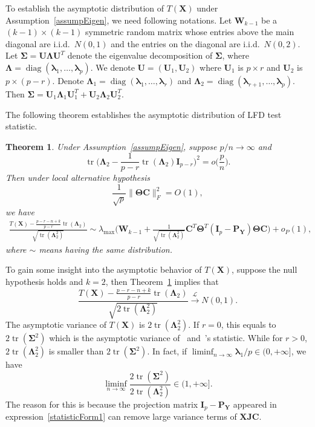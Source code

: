 \documentclass[12pt]{article} %
\DeclareMathOperator{\mytr}{tr}
\DeclareMathOperator{\mydiag}{diag}
\newcommand{\bX}{\mathbf{X}}
\newcommand{\bP}{\mathbf{P}}
\newcommand{\bY}{\mathbf{Y}}
\newcommand{\bJ}{\mathbf{J}}
\newcommand{\bC}{\mathbf{C}}
\newcommand{\bI}{\mathbf{I}}
\newcommand{\bU}{\mathbf{U}}
\newcommand{\bW}{\mathbf{W}}
\newcommand{\bfsym}[1]{\ensuremath{\boldsymbol{#1}}}
\def\blambda {\bfsym {\lambda}}
\def\bLambda {\bfsym {\Lambda}}
\def\bSigma {\bfsym {\Sigma}}
\def\bTheta {\bfsym {\Theta}}
\newtheorem{theorem}{Theorem}
\theoremstyle{definition}
\begin{document}
To establish the asymptotic distribution of $T(\bX)$ under Assumption~\ref{assumpEigen},
we need following notations.
Let $\bW_{k-1}$ be a $(k-1)\times(k-1)$ symmetric random matrix whose entries above the main diagonal are i.i.d.\ $N(0,1)$ and the entries on the diagonal are i.i.d.\ $N(0,2)$.
Let $\bSigma= \bU\bLambda \bU^T$ denote the eigenvalue decomposition of $\bSigma$, where $\bLambda =\mydiag (\blambda_1,\ldots,\blambda_p)$.
We denote $\bU=(\bU_1,\bU_2)$ where $\bU_1$ is $p\times r$ and $\bU_2$ is $p\times (p-r)$.
Denote $\bLambda_1=\mydiag(\blambda_1,\ldots,\blambda_r)$ and $\bLambda_2=\mydiag(\blambda_{r+1},\ldots,\blambda_p)$.
Then $\bSigma=\bU_1\bLambda_1 \bU_1^T+\bU_2\bLambda_2 \bU_2^T$.

The following theorem establishes the asymptotic distribution of LFD test statistic.
\begin{theorem}\label{thm1}
    Under Assumption~\ref{assumpEigen}, suppose $p/n\to \infty$ and
    $$
    \mytr\Big(\bLambda_2-\frac{1}{p-r}\mytr (\bLambda_2)\bI_{p-r}\Big)^2=o\big(\frac{p}{n}\big).
    $$
    Then under local alternative hypothesis
    \begin{equation*}
        \frac{1}{\sqrt{p}}\|\bTheta \bC\|_F^2=O(1),
    \end{equation*}
    we have
    $$
    \begin{aligned}
        \frac{T(\bX)-\frac{p-r-n+k}{p-r}\mytr(\bLambda_2)}{\sqrt{\mytr (\bLambda_2^2)}}
        \sim
        \lambda_{\max}\Big(\bW_{k-1}+\tfrac{1}{\sqrt{\mytr(\bLambda_2^2)}} \bC^T \bTheta^T (\bI_p-\bP_{\bY})\bTheta \bC\Big)
        +o_P(1),
    \end{aligned}
    $$
    where $\sim$ means having the same distribution.
\end{theorem}
To gain some insight into the asymptotic behavior of $T(\bX)$, suppose the null hypothesis holds and $k=2$, then Theorem~\ref{thm1} implies that
$$
        \frac{T(\bX)-\frac{p-r-n+k}{p-r}\mytr(\bLambda_2)}{\sqrt{2\mytr (\bLambda_2^2)}}\xrightarrow{\mathcal{L}}N(0,1).
$$
The asymptotic variance of $T(\bX)$ is ${2\mytr (\bLambda_2^2)}$.
If $r=0$, this equals to ${2\mytr (\bSigma^2)}$ which is the asymptotic variance of~\citet{Bai1996Efiect} and~\citet{Chen2010A}'s statistic.
While for $r>0$, ${2\mytr (\bLambda_2^2)}$ is smaller than $2\mytr(\bSigma^2)$.
In fact, if $\liminf_{n\to \infty} \blambda_1/p \in (0,+\infty]$, we have
$$
\liminf_{n\to \infty}\frac{2\mytr(\bSigma^2)}{2\mytr(\bLambda_2^2)}\in (1,+\infty].
$$
The reason for this is because the projection matrix $\bI_p-\bP_{\bY}$ appeared in expression~\eqref{statisticForm1} can remove large variance terms of $\bX\bJ \bC$.
\end{document}
